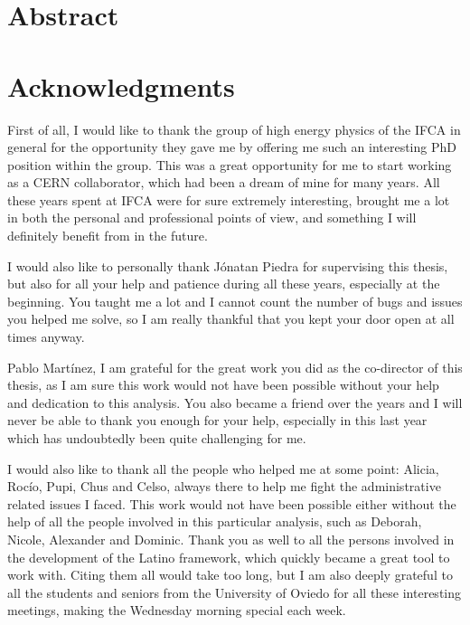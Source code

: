 \documentclass[a4paper, 10pt, openright]{report}
\begin{document}
\thispagestyle{empty}
\phantom{a}
\vfill
\newpage


\setlength{\parskip}{5pt}
\setcounter{page}{1}

\chapter*{Abstract}
\newpage
%

\chapter*{Acknowledgments}

First of all, I would like to thank the group of high energy physics of the \ac{IFCA} in general for the opportunity they gave me by offering me such an interesting PhD position within the group. This was a great opportunity for me to start working as a CERN collaborator, which had been a dream of mine for many years. All these years spent at \ac{IFCA} were for sure extremely interesting, brought me a lot in both the personal and professional points of view, and something I will definitely benefit from in the future.

I would also like to personally thank J\'{o}natan Piedra for supervising this thesis, but also for all your help and patience during all these years, especially at the beginning. You taught me a lot and I cannot count the number of bugs and issues you helped me solve, so I am really thankful that you kept your door open at all times anyway.

Pablo Mart\'{i}nez, I am grateful for the great work you did as the co-director of this thesis, as I am sure this work would not have been possible without your help and dedication to this analysis. You also became a friend over the years and I will never be able to thank you enough for your help, especially in this last year which has undoubtedly been quite challenging for me. 

I would also like to thank all the people who helped me at some point: Alicia, Roc\'{i}o, Pupi, Chus and Celso, always there to help me fight the administrative related issues I faced. This work would not have been possible either without the help of all the people involved in this particular analysis, such as Deborah, Nicole, Alexander and Dominic. Thank you as well to all the persons involved in the development of the Latino framework, which quickly became a great tool to work with. Citing them all would take too long, but I am also deeply grateful to all the students and seniors from the University of Oviedo for all these interesting meetings, making the Wednesday morning special each week. 
\end{document}
